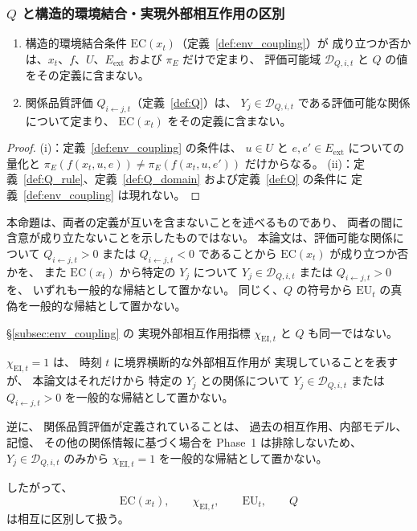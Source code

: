 \subsubsection{$Q$ と構造的環境結合・実現外部相互作用の区別}

\begin{proposition}[$Q$ と構造的環境結合条件の定義式上の相互非参照]
\label{prop:Q_not_RO_condition}
\begin{enumerate}[label=(\roman*)]
  \item 構造的環境結合条件 $\mathrm{EC}(x_t)$（定義~\ref{def:env_coupling}）が
  成り立つか否かは、$x_t$、$f$、$U$、$E_{\mathrm{ext}}$ および $\pi_E$ だけで定まり、
  評価可能域 $\mathcal D_{Q,i,t}$ と $Q$ の値をその定義に含まない。
  \item 関係品質評価 $Q_{i\leftarrow j,t}$（定義~\ref{def:Q}）は、
  $Y_j\in\mathcal D_{Q,i,t}$ である評価可能な関係について定まり、
  $\mathrm{EC}(x_t)$ をその定義に含まない。
\end{enumerate}
\end{proposition}

\begin{proof}
(i)：定義~\ref{def:env_coupling} の条件は、
$u\in U$ と $e,e'\in E_{\mathrm{ext}}$ についての量化と
$\pi_E(f(x_t,u,e))\neq\pi_E(f(x_t,u,e'))$ だけからなる。
(ii)：定義~\ref{def:Q_rule}、定義~\ref{def:Q_domain} および定義~\ref{def:Q} の条件に
定義~\ref{def:env_coupling} は現れない。
\end{proof}

本命題は、両者の定義が互いを含まないことを述べるものであり、
両者の間に含意が成り立たないことを示したものではない。
本論文は、評価可能な関係について
$Q_{i\leftarrow j,t}>0$ または $Q_{i\leftarrow j,t}<0$ であることから
$\mathrm{EC}(x_t)$ が成り立つか否かを、
また $\mathrm{EC}(x_t)$ から特定の $Y_j$ について
$Y_j\in\mathcal D_{Q,i,t}$ または $Q_{i\leftarrow j,t}>0$ を、
いずれも一般的な帰結として置かない。
同じく、$Q$ の符号から $\mathrm{EU}_t$ の真偽を一般的な帰結として置かない。

\begin{remark}[$Q$ と実現外部相互作用の非同一性]
\label{rem:Q_chi_distinction}
\S\ref{subsec:env_coupling} の
実現外部相互作用指標
$\chi_{\mathrm{EI},t}$
と $Q$ も同一ではない。

$\chi_{\mathrm{EI},t}=1$
は、
時刻 $t$ に境界横断的な外部相互作用が
実現していることを表すが、
本論文はそれだけから
特定の $Y_j$ との関係について
$Y_j\in\mathcal D_{Q,i,t}$
または
$Q_{i\leftarrow j,t}>0$
を一般的な帰結として置かない。

逆に、
関係品質評価が定義されていることは、
過去の相互作用、内部モデル、記憶、
その他の関係情報に基づく場合を
Phase~1 は排除しないため、
$Y_j\in\mathcal D_{Q,i,t}$
のみから
$\chi_{\mathrm{EI},t}=1$
を一般的な帰結として置かない。

したがって、
\[
  \mathrm{EC}(x_t),
  \qquad
  \chi_{\mathrm{EI},t},
  \qquad
  \mathrm{EU}_t,
  \qquad
  Q
\]
は相互に区別して扱う。
\end{remark}

